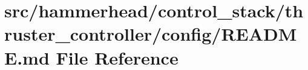 \hypertarget{control__stack_2thruster__controller_2config_2README_8md}{}\section{src/hammerhead/control\+\_\+stack/thruster\+\_\+controller/config/\+R\+E\+A\+D\+ME.md File Reference}
\label{control__stack_2thruster__controller_2config_2README_8md}
